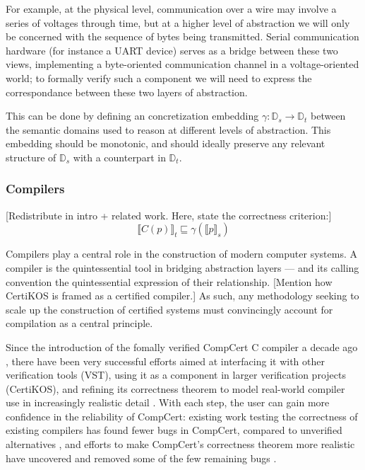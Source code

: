 \documentclass[acmsmall,timestamp,review,anonymous]{acmart}
\begin{document}
For example,
at the physical level,
communication over a wire may involve a series of voltages through time,
but at a higher level of abstraction
we will only be concerned with the sequence of bytes
being transmitted.
Serial communication hardware (for instance a UART device)
serves as a bridge between these two views,
implementing a byte-oriented communication channel
in a voltage-oriented world;
to formally verify such a component we will need to
express the correspondance between these two
layers of abstraction.

This can be done by defining an concretization embedding
$\gamma : \mathbb{D}_s \rightarrow \mathbb{D}_t$
between the semantic domains
used to reason at different levels of abstraction.
This embedding should be monotonic,
and should ideally preserve any relevant structure of $\mathbb{D}_s$
with a counterpart in $\mathbb{D}_t$.


\subsubsection{Compilers} %

[Redistribute in intro + related work.
Here, state the correctness criterion:]
\[ \llbracket C(p) \rrbracket_t \sqsubseteq
   \gamma(\llbracket p \rrbracket_s) \]

Compilers play a central role
in the construction of modern computer systems.
A compiler is the quintessential tool
in bridging abstraction layers ---
and its calling convention
the quintessential expression of their relationship.
[Mention how CertiKOS is framed as a certified compiler.]
As such,
any methodology seeking to scale up
the construction of certified systems
must convincingly account for compilation
as a central principle.

Since the introduction of the fomally verified
CompCert C compiler a decade ago \cite{compcert},
there have been very successful efforts aimed at
interfacing it with other verification tools (VST),
using it as a component in larger verification projects (CertiKOS),
and refining its correctness theorem
to model real-world compiler use
in increasingly realistic detail
\cite{qompcert,sepcompcert,compcompcert,compcerttso,compcertshm}.
With each step,
the user can gain more confidence in the reliability of CompCert:
existing work testing the correctness of existing compilers
has found fewer bugs in CompCert,
compared to unverified alternatives \cite{csmith},
and efforts to make CompCert's correctness theorem more realistic
have uncovered and removed some of the few remaining bugs \cite{sepcompcert}.
\end{document}
